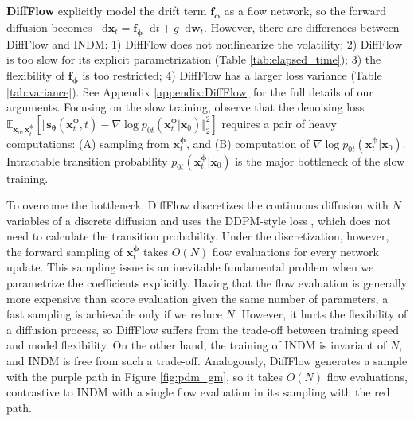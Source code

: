 \documentclass{article}
\theoremstyle{definition}
\theoremstyle{remark}
\newcommand*\diff{\mathop{}\!\mathrm{d}}
\begin{document}
	\textbf{DiffFlow} \citet{zhang2021diffusion} explicitly model the drift term $\mathbf{f}_{\bm{\phi}}$ as a flow network, so the forward diffusion becomes $\diff\mathbf{x}_{t}=\mathbf{f}_{\bm{\phi}}\diff t+g\diff\mathbf{w}_{t}$. However, there are differences between DiffFlow and INDM: 1) DiffFlow does not nonlinearize the volatility; 2) DiffFlow is too slow for its explicit parametrization (Table \ref{tab:elapsed_time}); 3) the flexibility of $\mathbf{f}_{\bm{\phi}}$ is too restricted; 4) DiffFlow has a larger loss variance (Table \ref{tab:variance}). See Appendix \ref{appendix:DiffFlow} for the full details of our arguments. Focusing on the slow training, observe that the denoising loss $\mathbb{E}_{\mathbf{x}_{0},\mathbf{x}_{t}^{\bm{\phi}}}[\Vert\mathbf{s}_{\bm{\theta}}(\mathbf{x}_{t}^{\bm{\phi}},t)-\nabla\log{p_{0t}(\mathbf{x}_{t}^{\bm{\phi}}\vert\mathbf{x}_{0})}\Vert_{2}^{2}]$ requires a pair of heavy computations: (A) sampling from $\mathbf{x}_{t}^{\bm{\phi}}$, and (B) computation of $\nabla\log{p_{0t}(\mathbf{x}_{t}^{\bm{\phi}}\vert\mathbf{x}_{0})}$. Intractable transition probability $p_{0t}(\mathbf{x}_{t}^{\bm{\phi}}\vert\mathbf{x}_{0})$ is the major bottleneck of the slow training. 
	
	To overcome the bottleneck, DiffFlow discretizes the continuous diffusion with $N$ variables of a discrete diffusion and uses the DDPM-style loss \cite{ho2020denoising}, which does not need to calculate the transition probability. Under the discretization, however, the forward sampling of $\mathbf{x}_{t}^{\bm{\phi}}$ takes $O(N)$ flow evaluations for every network update. This sampling issue is an inevitable fundamental problem when we parametrize the coefficients explicitly. Having that the flow evaluation is generally more expensive than score evaluation given the same number of parameters, a fast sampling is achievable only if we reduce $N$. However, it hurts the flexibility of a diffusion process, so DiffFlow suffers from the trade-off between training speed and model flexibility. On the other hand, the training of INDM is invariant of $N$, and INDM is free from such a trade-off. Analogously, DiffFlow generates a sample with the purple path in Figure \ref{fig:pdm_gm}, so it takes $O(N)$ flow evaluations, contrastive to INDM with a single flow evaluation in its sampling with the red path.
	
\end{document}
